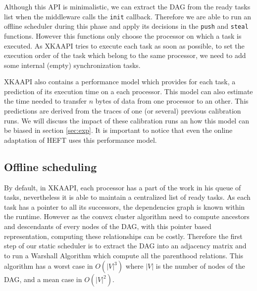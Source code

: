 \documentclass[10pt, conference, compsocconf,pdftex,dvipsnames]{IEEEtran}
\begin{document}
Although this API is minimalistic, we can extract the DAG from the ready tasks
list when the middleware calls the \texttt{init} callback. Therefore we are
able to run an offline scheduler during this phase and apply its decisions in
the \texttt{push} and \texttt{steal} functions.  However this functions only
choose the processor on which a task is executed. As XKAAPI tries to execute
each task as soon as possible, to set the execution order of the task which
belong to the same processor, we need to add some internal (empty)
synchronization tasks.

XKAAPI also contains a performance model which provides for each task, a
prediction of its execution time on a each processor. This model can also
estimate the time needed to transfer $n$ bytes of data from one processor to
an other. This predictions are derived from the traces of one (or several)
previous calibration runs. We will discuss the impact of these calibration
runs an how this model can be biased in section \ref{sec:exp}. It is important
to notice that even the online adaptation of HEFT uses this performance model.

\subsection{Offline scheduling}
\label{sec:impl-off}
By default, in XKAAPI, each processor has a part of the work in his queue of
tasks, nevertheless it is able to maintain a centralized list of ready tasks.
As each task has a pointer to all its successors, the dependencies graph is
known within the runtime. However as the convex cluster algorithm need to
compute ancestors and descendants of every nodes of the DAG, with this pointer
based representation, computing these relationships can be costly. Therefore
the first step of our static scheduler is to extract the DAG into an adjacency
matrix and to run a Warshall Algorithm which compute all the parenthood
relations. This algorithm has a worst case in $O(|V|^3)$ where $|V|$ is the
number of nodes of the DAG, and a mean case in $O(|V|^2)$.
\end{document}

